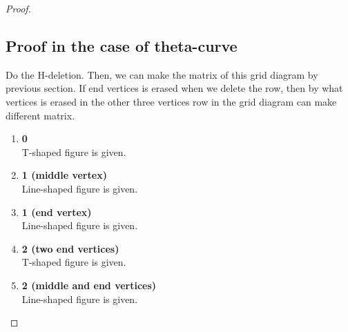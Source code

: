\documentclass{article}
\theoremstyle{definition}
\begin{document}
\begin{proof}
\subsection{Proof in the case of theta-curve}
Do the H-deletion. Then, we can make the matrix of this grid diagram by previous section. If end vertices is erased when we delete the row, then by what vertices is erased in the other three vertices row in the grid diagram can make different matrix.
\begin{enumerate}
    \item \textbf{0}\\
    T-shaped figure is given.
    \item \textbf{1 (middle vertex)}\\
    Line-shaped figure is given.
    \item \textbf{1 (end vertex)}\\
    Line-shaped figure is given.
    \item \textbf{2 (two end vertices)}\\
    T-shaped figure is given.
    \item \textbf{2 (middle and end vertices)}\\
    Line-shaped figure is given.
\end{enumerate}


\end{proof}
\end{document}
